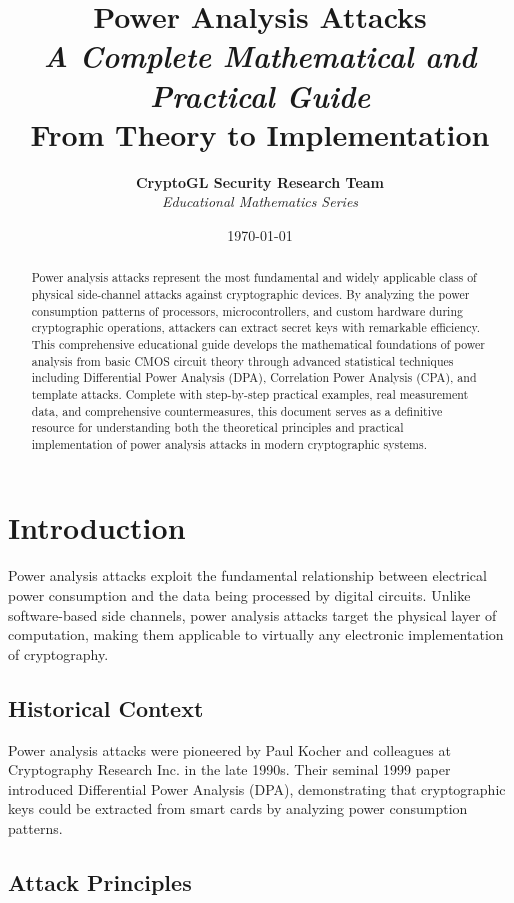 \documentclass[11pt,a4paper]{article}
\title{
    \Huge\textbf{Power Analysis Attacks} \\
    \Large\textit{A Complete Mathematical and Practical Guide} \\
    \large From Theory to Implementation
}
\author{
    \textbf{CryptoGL Security Research Team} \\
    \textit{Educational Mathematics Series}
}
\date{\today}
\theoremstyle{definition}
\begin{document}
\maketitle

\begin{abstract}
Power analysis attacks represent the most fundamental and widely applicable class of physical side-channel attacks against cryptographic devices. By analyzing the power consumption patterns of processors, microcontrollers, and custom hardware during cryptographic operations, attackers can extract secret keys with remarkable efficiency. This comprehensive educational guide develops the mathematical foundations of power analysis from basic CMOS circuit theory through advanced statistical techniques including Differential Power Analysis (DPA), Correlation Power Analysis (CPA), and template attacks. Complete with step-by-step practical examples, real measurement data, and comprehensive countermeasures, this document serves as a definitive resource for understanding both the theoretical principles and practical implementation of power analysis attacks in modern cryptographic systems.
\end{abstract}

\tableofcontents
\newpage

\section{Introduction}

Power analysis attacks exploit the fundamental relationship between electrical power consumption and the data being processed by digital circuits. Unlike software-based side channels, power analysis attacks target the physical layer of computation, making them applicable to virtually any electronic implementation of cryptography.

\subsection{Historical Context}

Power analysis attacks were pioneered by Paul Kocher and colleagues at Cryptography Research Inc. in the late 1990s. Their seminal 1999 paper \cite{kocher1999differential} introduced Differential Power Analysis (DPA), demonstrating that cryptographic keys could be extracted from smart cards by analyzing power consumption patterns.

\subsection{Attack Principles}
\end{document}
